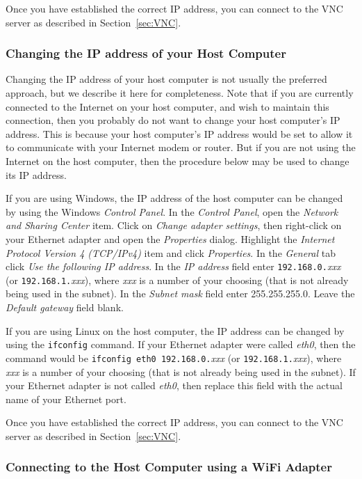 \documentclass[11pt, twoside, pdftex]{article}
\begin{document}
Once you have established the correct IP address, you can connect to the VNC server as
described in Section~\ref{sec:VNC}.

\subsubsection*{Changing the IP address of your Host Computer}

Changing the IP address of your host computer is not usually the preferred approach, but
we describe it here for completeness.
Note that if you are currently connected to the Internet on your host computer, and wish
to maintain this connection, then you probably do not want to change your host computer's
IP address. This is because your host computer's IP address would be set to allow it to
communicate with your Internet modem or router. But if you are not using the Internet on 
the host computer, then the procedure below may be used to change its IP address.

If you are using Windows, the IP address of the host computer can be changed by using the
Windows {\it Control Panel}. In the {\it Control Panel}, open the {\it Network and Sharing
Center} item. Click on {\it Change adapter settings}, then right-click on your Ethernet
adapter and open the {\it Properties} dialog. Highlight the {\it Internet Protocol Version 4
(TCP/IPv4)} item and click {\it Properties}. In the {\it General} tab click {\it Use the
following IP address}. In the {\it IP address} field enter \texttt{192.168.0.}{\it xxx} (or 
\texttt{192.168.1.}{\it xxx}), where {\it xxx} is a number of your choosing (that is not 
already being used in the subnet). In the {\it Subnet mask} field enter 255.255.255.0. Leave the 
{\it Default gateway} field blank.

If you are using Linux on the host computer, the IP address can be changed by using the
\texttt{ifconfig} command. If your Ethernet adapter were called {\it eth0}, then the command 
would be \texttt{ifconfig eth0 192.168.0.}{\it xxx} 
(or \texttt{192.168.1.}{\it xxx}), where {\it xxx} is a number
of your choosing (that is not already being used in the subnet). If your Ethernet adapter
is not called {\it eth0}, then replace this field with the actual name of your Ethernet port.

Once you have established the correct IP address, you can connect to the VNC server as
described in Section~\ref{sec:VNC}.

\subsubsection{Connecting to the Host Computer using a WiFi Adapter}
\label{sec:WiFi}
\end{document}
